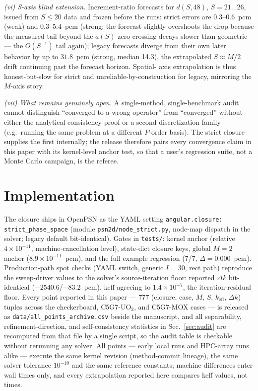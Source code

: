 \documentclass[11pt,a4paper]{article}
\begin{document}
\emph{(vi) S-axis blind extension.} Increment-ratio forecasts for
$d(S,48)$, $S=21\ldots26$, issued from $S\le20$ data and frozen
before the runs: strict errors are $0.3$--$0.6$~pcm (weak) and
$0.3$--$5.4$~pcm (strong; the forecast slightly overshoots the drop
because the measured tail beyond the $a(S)$ zero crossing decays
slower than geometric --- the $O(S^{-1})$ tail again); legacy
forecasts diverge from their own later behavior by up to
$31.8$~pcm (strong, median 14.3), the extrapolated
$S\approx M/2$ drift continuing past the forecast horizon. Spatial-
axis extrapolation is thus honest-but-slow for strict and
unreliable-by-construction for legacy, mirroring the $M$-axis story.

\emph{(vii) What remains genuinely open.} A single-method,
single-benchmark audit cannot distinguish ``converged to a wrong
operator'' from ``converged'' without either the analytical
consistency proof or a second discretization family (e.g.\ running
the same problem at a different $P$-order basis). The strict closure
supplies the first internally; the release therefore pairs every
convergence claim in this paper with its kernel-level anchor test, so
that a user's regression suite, not a Monte Carlo campaign, is the
referee.

\section{Implementation}
\label{sec:impl}
The closure ships in OpenPSN as the YAML setting
\texttt{angular.closure: strict\_\allowbreak phase\_\allowbreak space}
(module \texttt{psn2d/\allowbreak node\_\allowbreak strict.py}, node-map
dispatch in the solver; legacy default bit-identical).  Gates in
\texttt{tests/}: kernel anchor (relative $4\times10^{-11}$,
machine-cancellation level), state-dict closure keys, global $M{=}2$
anchor ($8.9\times10^{-11}$~pcm), and the full example regression
(7/7, $\Delta=0.000$~pcm).  Production-path spot checks (YAML switch,
generic $I{=}30$, rect path) reproduce the sweep-driver values to the
solver's source-iteration floor: reported $\Delta k$ bit-identical
($-2540.6$/$-83.2$~pcm), keff agreeing to $1.4\times10^{-7}$, the
iteration-residual floor.  Every point reported in this paper ---
777 (closure, case, $M$, $S$, $k_{\mathrm{eff}}$, $\Delta k$) tuples
across the checkerboard, C5G7-UO$_2$, and C5G7-MOX cases --- is
released as \texttt{data/all\_points\_archive.csv} beside the
manuscript, and all separability, refinement-direction, and
self-consistency statistics in Sec.~\ref{sec:audit} are recomputed
from that file by a single script, so the audit table is checkable
without rerunning any solver.  All points
--- early local runs and HPC-array runs alike --- execute the same
kernel revision (method-commit lineage), the same solver tolerance
$10^{-10}$ and the same reference constants; machine differences
enter wall times only, and every extrapolation reported here
compares keff values, not times.
\end{document}
